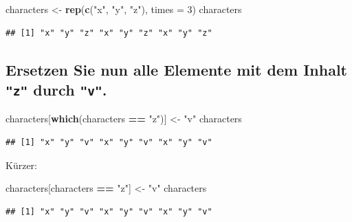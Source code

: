 \documentclass[12pt,a4paper]{article}
\newenvironment{Shaded}{\begin{snugshade}}{\end{snugshade}}
\newcommand{\AttributeTok}[1]{\textcolor[rgb]{0.13,0.29,0.53}{#1}}
\newcommand{\DecValTok}[1]{\textcolor[rgb]{0.00,0.00,0.81}{#1}}
\newcommand{\FunctionTok}[1]{\textcolor[rgb]{0.13,0.29,0.53}{\textbf{#1}}}
\newcommand{\NormalTok}[1]{#1}
\newcommand{\OtherTok}[1]{\textcolor[rgb]{0.56,0.35,0.01}{#1}}
\newcommand{\SpecialCharTok}[1]{\textcolor[rgb]{0.81,0.36,0.00}{\textbf{#1}}}
\newcommand{\StringTok}[1]{\textcolor[rgb]{0.31,0.60,0.02}{#1}}
\begin{document}
\begin{Shaded}
\begin{Highlighting}[]
\NormalTok{    characters }\OtherTok{\textless{}{-}} \FunctionTok{rep}\NormalTok{(}\FunctionTok{c}\NormalTok{(}\StringTok{"x"}\NormalTok{, }\StringTok{"y"}\NormalTok{, }\StringTok{"z"}\NormalTok{), }\AttributeTok{times =} \DecValTok{3}\NormalTok{)}
\NormalTok{    characters}
\end{Highlighting}
\end{Shaded}

\begin{verbatim}
## [1] "x" "y" "z" "x" "y" "z" "x" "y" "z"
\end{verbatim}

\vspace{0.5cm}

\hypertarget{ersetzen-sie-nun-alle-elemente-mit-dem-inhalt-durch-.}{%
\subsection{\texorpdfstring{Ersetzen Sie nun alle Elemente mit dem
Inhalt \texttt{"z"} durch
\texttt{"v"}.}{Ersetzen Sie nun alle Elemente mit dem Inhalt  durch .}}\label{ersetzen-sie-nun-alle-elemente-mit-dem-inhalt-durch-.}}

\begin{Shaded}
\begin{Highlighting}[]
\NormalTok{    characters[}\FunctionTok{which}\NormalTok{(characters }\SpecialCharTok{==} \StringTok{"z"}\NormalTok{)] }\OtherTok{\textless{}{-}} \StringTok{"v"}
\NormalTok{    characters}
\end{Highlighting}
\end{Shaded}

\begin{verbatim}
## [1] "x" "y" "v" "x" "y" "v" "x" "y" "v"
\end{verbatim}

Kürzer:

\begin{Shaded}
\begin{Highlighting}[]
\NormalTok{    characters[characters }\SpecialCharTok{==} \StringTok{"z"}\NormalTok{] }\OtherTok{\textless{}{-}} \StringTok{"v"}
\NormalTok{    characters}
\end{Highlighting}
\end{Shaded}

\begin{verbatim}
## [1] "x" "y" "v" "x" "y" "v" "x" "y" "v"
\end{verbatim}
\end{document}
